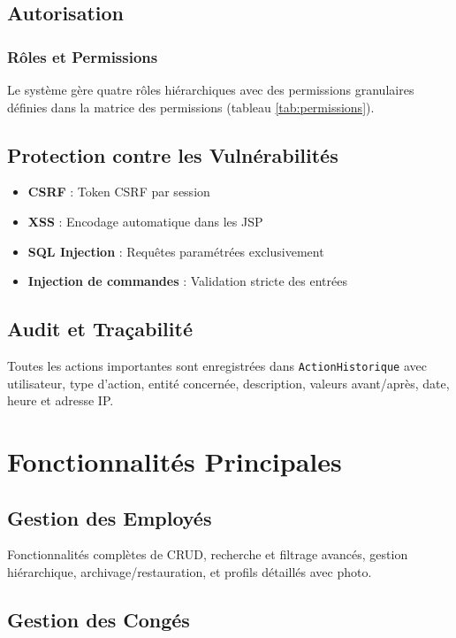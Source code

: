 \documentclass[12pt,a4paper,twoside]{report}
\begin{document}
\section{Autorisation}

\subsection{Rôles et Permissions}

Le système gère quatre rôles hiérarchiques avec des permissions granulaires définies dans la matrice des permissions (tableau \ref{tab:permissions}).

\section{Protection contre les Vulnérabilités}

\begin{itemize}
    \item \textbf{CSRF} : Token CSRF par session
    \item \textbf{XSS} : Encodage automatique dans les JSP
    \item \textbf{SQL Injection} : Requêtes paramétrées exclusivement
    \item \textbf{Injection de commandes} : Validation stricte des entrées
\end{itemize}

\section{Audit et Traçabilité}

Toutes les actions importantes sont enregistrées dans \texttt{ActionHistorique} avec utilisateur, type d'action, entité concernée, description, valeurs avant/après, date, heure et adresse IP.

\chapter{Fonctionnalités Principales}

\section{Gestion des Employés}

Fonctionnalités complètes de CRUD, recherche et filtrage avancés, gestion hiérarchique, archivage/restauration, et profils détaillés avec photo.

\section{Gestion des Congés}
\end{document}
